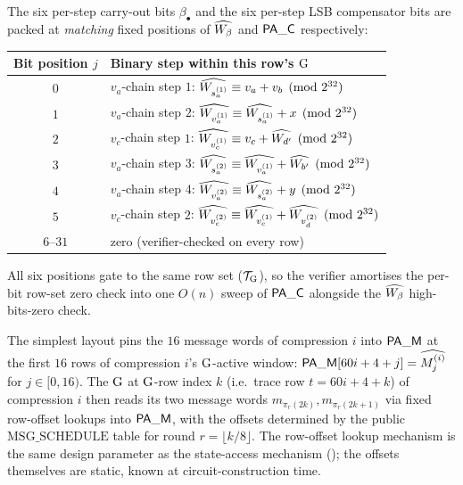 \begin{remark}
\label{rem:b3-binius-packing}
The six per-step carry-out bits $\beta_\bullet$ and the six per-step
LSB compensator bits are packed at \emph{matching} fixed positions of
$\widehat{W_\beta}$ and $\mathsf{PA\_C}$ respectively:
\begin{center}
\small
\begin{tabular}{cl}
\toprule
\textbf{Bit position $j$} & \textbf{Binary step within this row's $\operatorname{G}$} \\
\midrule
$0$ & $v_a$-chain step $1$: $\widehat{W_{s_a^{(1)}}} \equiv v_a + v_b \pmod{2^{32}}$ \\
$1$ & $v_a$-chain step $2$: $\widehat{W_{v_a^{(1)}}} \equiv \widehat{W_{s_a^{(1)}}} + x \pmod{2^{32}}$ \\
$2$ & $v_c$-chain step $1$: $\widehat{W_{v_c^{(1)}}} \equiv v_c + \widehat{W_{d'}} \pmod{2^{32}}$ \\
$3$ & $v_a$-chain step $3$: $\widehat{W_{s_a^{(2)}}} \equiv \widehat{W_{v_a^{(1)}}} + \widehat{W_{b'}} \pmod{2^{32}}$ \\
$4$ & $v_a$-chain step $4$: $\widehat{W_{v_a^{(2)}}} \equiv \widehat{W_{s_a^{(2)}}} + y \pmod{2^{32}}$ \\
$5$ & $v_c$-chain step $2$: $\widehat{W_{v_c^{(2)}}} \equiv \widehat{W_{v_c^{(1)}}} + \widehat{W_{v_d^{(2)}}} \pmod{2^{32}}$ \\
$6$--$31$ & zero (verifier-checked on every row) \\
\bottomrule
\end{tabular}
\end{center}
All six positions gate to the same row set ($\mathcal{T}_{\operatorname{G}}$), so
the verifier amortises the per-bit row-set zero check into one $O(n)$
sweep of $\mathsf{PA\_C}$ alongside the $\widehat{W_\beta}$ high-bits-zero
check.
\end{remark}

\begin{remark}\label{rem:b3-msg-layout}
The simplest layout pins the $16$ message words of compression $i$
into $\mathsf{PA\_M}$ at the first $16$ rows of compression $i$'s
$\operatorname{G}$-active window: $\mathsf{PA\_M}[60i + 4 + j] = \widehat{M^{(i)}_j}$
for $j \in [0, 16)$. The $\operatorname{G}$ at $\operatorname{G}$-row index $k$ (i.e.\ trace
row $t = 60i + 4 + k$) of compression $i$ then reads its two message
words $m_{\pi_r(2k)}, m_{\pi_r(2k+1)}$ via fixed row-offset lookups
into $\mathsf{PA\_M}$, with the offsets determined by the public
$\mathrm{MSG\_SCHEDULE}$ table for round $r = \lfloor k / 8 \rfloor$.
The row-offset lookup mechanism is the same design parameter as the
state-access mechanism (); the offsets
themselves are static, known at circuit-construction time.
\end{remark}

